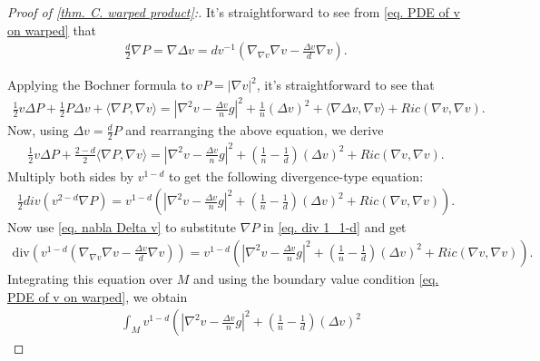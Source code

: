 \documentclass[12pt]{amsart}%
\numberwithin{equation}{section}
\numberwithin{lemma}{section}
\numberwithin{proposition}{section}
\numberwithin{corollary}{section}
\numberwithin{remark}{section}
\begin{document}
\begin{proof}[Proof of \cref{thm. C. warped product}:]
    It's straightforward to see from \cref{eq. PDE of v on warped} that
    \begin{align}\label{eq. nabla Delta v}
        \frac{d}{2}\nabla P=\nabla \Delta v
        =dv^{-1}
        \left(\nabla_{\nabla v}\nabla v-\frac{\Delta v}{d}\nabla v\right).
    \end{align}

    Applying the Bochner formula to $vP=|\nabla v|^2$, it's straightforward to see that
    \begin{align*}
        \frac{1}{2}v\Delta P +\frac{1}{2}P\Delta v+\langle\nabla P,\nabla v\rangle
        =\left|\nabla^2 v-\frac{\Delta v}{n}g\right|^2
        +\frac{1}{n}(\Delta v)^2
        +\langle\nabla \Delta v,\nabla v\rangle
        +Ric(\nabla v,\nabla v)
        .
    \end{align*}
    Now, using $\Delta v=\frac{d}{2}P$ and rearranging the above equation, we derive
    \begin{align*}
        \frac{1}{2}v\Delta P+\frac{2-d}{2}\langle\nabla P,\nabla v\rangle
        =\left|\nabla^2 v-\frac{\Delta v}{n}g\right|^2
        +\left(\frac{1}{n}-\frac{1}{d}\right)(\Delta v)^2
        +Ric(\nabla v,\nabla v)
        .
    \end{align*}
    Multiply both sides by $v^{1-d}$ to get the following divergence-type equation:
    \begin{align}\label{eq. div 1_1-d}
        \frac{1}{2}div(v^{2-d}\nabla P)
        =v^{1-d}\left(
        \left|\nabla^2 v-\frac{\Delta v}{n}g\right|^2
        +\left(\frac{1}{n}-\frac{1}{d}\right)(\Delta v)^2
        +Ric(\nabla v,\nabla v)
        \right).
    \end{align}
    Now use \cref{eq. nabla Delta v} to substitute $\nabla P$ in \cref{eq. div 1_1-d} and get
    \begin{align}\label{eq. warped div 1_1-d_new}
        \mathrm{div}\left(
        v^{1-d}\left(\nabla_{\nabla v}\nabla v-\frac{\Delta v}{d}\nabla v\right)
        \right)
        =v^{1-d}\left(
        \left|\nabla^2 v-\frac{\Delta v}{n}g\right|^2
        +\left(\frac{1}{n}-\frac{1}{d}\right)(\Delta v)^2
        +Ric(\nabla v,\nabla v)
        \right).
    \end{align}
    Integrating this equation over $M$ and using the boundary value condition \cref{eq. PDE of v on warped}, we obtain
    \begin{align}\label{eq. warped 1}
        &\int_{M}v^{1-d}\left(
        \left|\nabla^2 v-\frac{\Delta v}{n}g\right|^2
        +\left(\frac{1}{n}-\frac{1}{d}\right)(\Delta v)^2

\end{align}
\end{proof}
\end{document}
